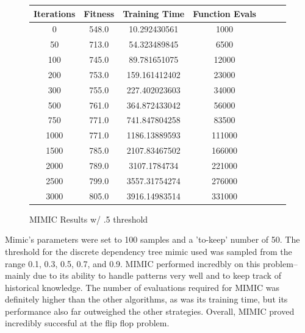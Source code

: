 \documentclass[h]{article}
\begin{document}
\begin{figure}[H] 
\begin{tabular}{ | c | c  | c | c | c | c | c |} 
\hline
\textbf{Iterations} & \textbf{Fitness} & \textbf{Training Time} & \textbf{Function Evals}   \\
\hline
0 & 548.0 & 10.292430561 & 1000 \\ \hline 
50 & 713.0 & 54.323489845 & 6500 \\ \hline 
100 & 745.0 & 89.781651075 & 12000  \\ \hline 
200 & 753.0 & 159.161412402 & 23000  \\ \hline 
300 & 755.0 & 227.402023603 & 34000  \\ \hline 
500 & 761.0 & 364.872433042 & 56000 \\ \hline 
750 & 771.0 & 741.847804258 & 83500 \\ \hline 
1000 & 771.0 & 1186.13889593 & 111000 \\ \hline 
1500 & 785.0 & 2107.83467502 & 166000 \\ \hline 
2000 & 789.0 & 3107.1784734 & 221000 \\ \hline 
2500 & 799.0 & 3557.31754274 & 276000 \\ \hline 
3000 & 805.0 & 3916.14983514 & 331000 \\ \hline 
\end{tabular}
\caption*{MIMIC Results w/ .5 threshold} 
\end{figure}

Mimic's parameters were set to 100 samples and a 'to-keep' number of 50.  
The threshold for the discrete dependency tree mimic used was sampled from the 
range 0.1, 0.3, 0.5, 0.7, and 0.9.  MIMIC performed incredbly on this problem--mainly due to its ability to handle patterns very well and to keep track of historical 
knowledge.  The number of 
evaluations required for MIMIC was definitely higher than the other 
algorithms, as was its training time, but its performance also far outweighed the other strategies.  
Overall, MIMIC proved incredibly succesful at the flip flop problem.
\end{document}
